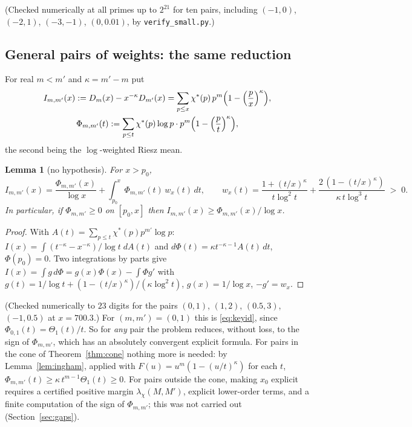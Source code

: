 \documentclass[11pt]{amsart}
\newtheorem{lemma}[theorem]{Lemma}
\theoremstyle{definition}
\numberwithin{equation}{section}
\begin{document}
\smallskip
(Checked numerically at all primes up to $2^{21}$ for ten pairs,
including $(-1,0)$, $(-2,1)$, $(-3,-1)$, $(0,0.01)$, by
\texttt{verify\_small.py}.)

\subsection{General pairs of weights: the same reduction}

For real $m<m'$ and $\kappa=m'-m$ put
\begin{gather*}
I_{m,m'}(x):=D_m(x)-x^{-\kappa}D_{m'}(x)
=\sum_{p\le x}\chi^*(p)\,p^m\Bigl(1-\Bigl(\frac px\Bigr)^\kappa\Bigr),\\
\Phi_{m,m'}(t):=\sum_{p\le t}\chi^*(p)\log p\cdot
p^m\Bigl(1-\Bigl(\frac pt\Bigr)^\kappa\Bigr),
\end{gather*}
the second being the $\log$-weighted Riesz mean.

\begin{lemma}[no hypothesis]\label{lem:pairs}
For $x>p_0$,
\[
I_{m,m'}(x)=\frac{\Phi_{m,m'}(x)}{\log x}
+\int_{p_0}^x\Phi_{m,m'}(t)\,w_x(t)\,dt,
\qquad
w_x(t)=\frac{1+(t/x)^\kappa}{t\log^2t}
+\frac{2\,(1-(t/x)^\kappa)}{\kappa\,t\log^3t}\;>\;0 .
\]
In particular, if $\Phi_{m,m'}\ge0$ on $[p_0,x]$ then
$I_{m,m'}(x)\ge\Phi_{m,m'}(x)/\log x$.
\end{lemma}

\begin{proof}
With $A(t)=\sum_{p\le t}\chi^*(p)p^{m'}\log p$:
$I(x)=\int(t^{-\kappa}-x^{-\kappa})/\log t\;dA(t)$ and
$d\Phi(t)=\kappa t^{-\kappa-1}A(t)\,dt$, $\Phi(p_0)=0$. Two
integrations by parts give
$I(x)=\int g\,d\Phi=g(x)\Phi(x)-\int\Phi g'$ with
$g(t)=1/\log t+(1-(t/x)^\kappa)/(\kappa\log^2t)$, $g(x)=1/\log x$,
$-g'=w_x$.
\end{proof}

(Checked numerically to $23$ digits for the pairs $(0,1)$, $(1,2)$,
$(0.5,3)$, $(-1,0.5)$ at $x=700.3$.) For $(m,m')=(0,1)$ this is
\eqref{eq:keyid}, since $\Phi_{0,1}(t)=\Theta_1(t)/t$. So for
\emph{any} pair the problem reduces, without loss, to the sign of
$\Phi_{m,m'}$, which has an absolutely convergent explicit formula.
For pairs in the cone of Theorem~\ref{thm:cone} nothing more is
needed: by Lemma~\ref{lem:ingham}, applied with
$F(u)=u^m(1-(u/t)^\kappa)$ for each $t$,
$\Phi_{m,m'}(t)\ge\kappa\,t^{m-1}\Theta_1(t)\ge0$. For pairs outside
the cone, making $x_0$ explicit requires a certified positive margin
$\lambda_\chi(M,M')$, explicit lower-order terms, and a finite
computation of the sign of $\Phi_{m,m'}$; this was not carried out
(Section~\ref{sec:gaps}).
\end{document}
